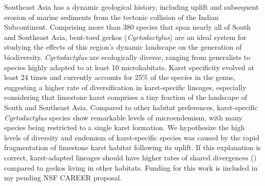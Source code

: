 Southeast Asia has a dynamic geological history, including uplift and
subsequent erosion of marine sediments from the tectonic collision of the
Indian Subcontinent.
Comprising
more than 380
species that span nearly all of South and Southeast
Asia,
bent-toed geckos (\textit{Cyrtodactylus}) are an ideal system for studying
the effects of this region's dynamic landscape on the generation of
biodiversity.
\textit{Cyrtodactylus} are ecologically diverse, ranging from generalists
to species highly adapted to at least 10 microhabitats.
Karst specificity evolved at least 24 times and currently
accounts for 25\% of the species in the genus,
suggesting a higher rate of diversification in karst-specific
lineages, especially considering that limestone karst comprises a tiny fraction
of the landscape of South and Southeast Asia.
Compared to other habitat preferences,
karst-specific \textit{Cyrtodactylus} species show remarkable levels
of microendemism, with many species being restricted to a single
karst formation.
We hypothesize the high levels of diversity and endemism of karst-specific
species was caused by the rapid fragmentation of limestone karst
habitat following its uplift.
If this explanation is correct, karst-adapted lineages should have higher rates
of shared divergences (\burstrate) compared to geckos living in other habitats.
Funding for this work is included in my pending NSF CAREER proposal.


